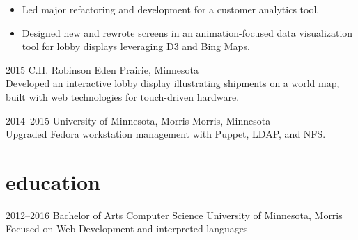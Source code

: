 \documentclass[]{cv-style} %
\begin{document}
\begin{entrylist}
{
\begin{itemize}
    \item[--] Led major refactoring and development for a customer analytics tool.
    \item[--] Designed new and rewrote screens in an animation-focused data visualization tool for lobby displays leveraging D3 and Bing Maps.
\end{itemize}}


\entry
{2015}
{C.H. Robinson}
{Eden Prairie, Minnesota}
{ \\
Developed an interactive lobby display illustrating shipments on a world map, built with web technologies for touch-driven hardware.}


\entry
{2014--2015}
{University of Minnesota, Morris}
{Morris, Minnesota}
{ \\
Upgraded Fedora workstation management with Puppet, LDAP, and NFS.}


\end{entrylist}


\section{education}

\begin{entrylist}


\entry
{2012--2016}
{Bachelor of Arts {\normalfont Computer Science}}
{University of Minnesota, Morris}
{\small{Focused on Web Development and interpreted languages}}


\end{entrylist}

\end{document}
